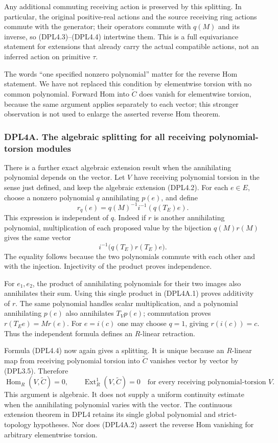 Any additional commuting receiving action is preserved by this
splitting. In particular, the original positive-real actions and the
source receiving ring actions commute with the generator; their
operators commute with \(q(M)\) and its inverse, so (DPL4.3)--(DPL4.4)
intertwine them. This is a full equivariance statement for extensions
that already carry the actual compatible actions, not an inferred action
on primitive \(\tau\).

The words ``one specified nonzero polynomial'' matter for the reverse
Hom statement. We have not replaced this condition by elementwise
torsion with no common polynomial. Forward Hom into \(\widetilde C\)
does vanish for elementwise torsion, because the same argument applies
separately to each vector; this stronger observation is not used to
enlarge the asserted reverse Hom theorem.

\subsubsection{DPL4A. The algebraic splitting for all receiving
polynomial-torsion
modules}\label{dpl4a.-the-algebraic-splitting-for-all-receiving-polynomial-torsion-modules}

There is a further exact algebraic extension result when the
annihilating polynomial depends on the vector. Let \(V\) have receiving
polynomial torsion in the sense just defined, and keep the algebraic
extension (DPL4.2). For each \(e\in E\), choose a nonzero polynomial
\(q\) annihilating \(p(e)\), and define \[
r_q(e)=q(M)^{-1}i^{-1}(q(T_E)e).
\tag{DPL4A.1}
\] This expression is independent of \(q\). Indeed if \(r\) is another
annihilating polynomial, multiplication of each proposed value by the
bijection \(q(M)r(M)\) gives the same vector \[
i^{-1}\bigl(q(T_E)r(T_E)e\bigr).
\] The equality follows because the two polynomials commute with each
other and with the injection. Injectivity of the product proves
independence.

For \(e_1,e_2\), the product of annihilating polynomials for their two
images also annihilates their sum. Using this single product in
(DPL4A.1) proves additivity of \(r\). The same polynomial handles scalar
multiplication, and a polynomial annihilating \(p(e)\) also annihilates
\(T_Vp(e)\); commutation proves \(r(T_Ee)=Mr(e)\). For \(e=i(c)\) one
may choose \(q=1\), giving \(r(i(c))=c\). Thus the independent formula
defines an \(R\)-linear retraction.

Formula (DPL4.4) now again gives a splitting. It is unique because an
\(R\)-linear map from receiving polynomial torsion into \(\widetilde C\)
vanishes vector by vector by (DPL3.5). Therefore \[
\operatorname{Hom}_R(V,\widetilde C)=0,\qquad
\operatorname{Ext}^1_R(V,\widetilde C)=0
\quad\text{for every receiving polynomial-torsion }V.
\tag{DPL4A.2}
\] This argument is algebraic. It does not supply a uniform continuity
estimate when the annihilating polynomial varies with the vector. The
continuous extension theorem in DPL4 retains its single global
polynomial and strict-topology hypotheses. Nor does (DPL4A.2) assert the
reverse Hom vanishing for arbitrary elementwise torsion.

